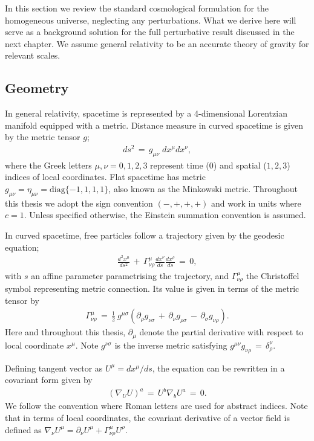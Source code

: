 In this section we review the standard cosmological formulation for the homogeneous universe, neglecting any perturbations. What we derive here will serve as a background solution for the full perturbative result discussed in the next chapter. We assume general relativity to be an accurate theory of gravity for relevant scales.

\subsection{Geometry}

In general relativity, spacetime is represented by a 4-dimensional Lorentzian manifold equipped with a metric. Distance measure in curved spacetime is given by the metric tensor $g$;
\begin{align}
	ds^2 \,=\, g_{\mu \nu} \; dx^\mu dx^\nu	,
\end{align}
where the Greek letters $\mu, \nu = 0,1,2,3$ represent time ($0$) and spatial ($1,2,3$) indices of local coordinates. Flat spacetime has metric $g_{\mu\nu} = \eta_{\mu\nu} = \text{diag}\{-1, 1, 1, 1\}$, also known as the Minkowski metric. Throughout this thesis we adopt the sign convention $(-, +, +, +)$ and work in units where $c=1$. Unless specified otherwise, the Einstein summation convention is assumed. 

In curved spacetime, free particles follow a trajectory given by the geodesic equation;
\begin{align}
	\frac{d^2x^\mu}{ds^2} \,+\, \Gamma^\mu_{\nu \rho} \frac{dx^\nu}{ds} \frac{dx^\rho}{ds} \,=\, 0,  \label{eqn:geodesic}
\end{align}
with $s$ an affine parameter parametrising the trajectory, and $\Gamma^\mu_{\nu\rho}$ the Christoffel symbol representing metric connection. Its value is given in terms of the metric tensor by
\begin{align}
	\Gamma^{\mu}_{\nu\rho} \,=\, \frac{1}{2}~ g^{\mu\sigma} \left( \partial_\rho g_{\nu\sigma} \,+\, \partial_\nu g_{\rho\sigma} \,-\, \partial_\sigma g_{\nu\rho}  \right). \label{def:Levi_Civita}
\end{align}
Here and throughout this thesis, $\partial_\mu$ denote the partial derivative with respect to local coordinate $x^\mu$. Note $g^{\nu\sigma}$ is the inverse metric satisfying $g^{\mu\nu} g_{\nu\rho} \,=\, \delta^\nu_\rho$.

Defining tangent vector as $U^\mu = dx^\mu / ds$, the equation can be rewritten in a covariant form given by
\begin{align}
	\left( \nabla_U U \right)^a \,=\, U^b \nabla_b U^a \,=\, 0.
\end{align}
We follow the convention where Roman letters are used for abstract indices. Note that in terms of local coordinates, the covariant derivative of a vector field is defined as $\nabla_\nu U^\mu = \partial_\nu U^\mu + \Gamma^\mu_{\nu\rho} U^\rho$.

